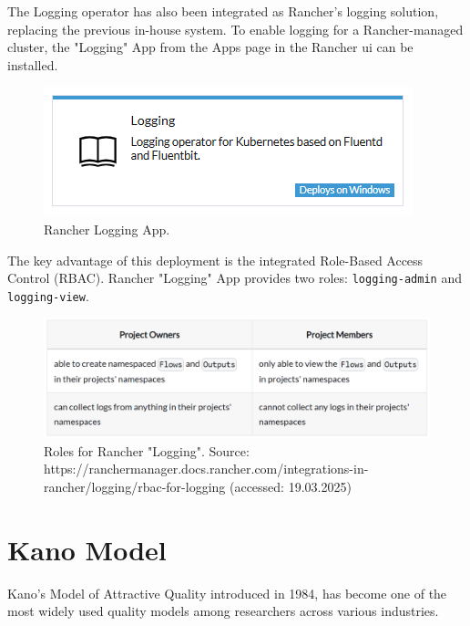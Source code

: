 \documentclass[../main.tex]{subfiles}
\begin{document}
The Logging operator has also been integrated as Rancher's logging solution, replacing the previous in-house system. To enable logging for a Rancher-managed cluster, the "Logging" App from the Apps page in the Rancher \gls{ui} can be installed.

\begin{figure}[H]
        \centering
        \includegraphics[]{img/3-background/centralized_logging/logging_app.png}
        \caption{Rancher Logging App.}
        \label{fig:logging_app}
\end{figure}

The key advantage of this deployment is the integrated Role-Based Access Control (RBAC). Rancher "Logging" App provides two roles: \texttt{logging-admin} and \texttt{logging-view}.

\begin{figure}[H]
        \centering
        \includegraphics[scale=0.7]{img/3-background/rancher_logging_app/roles.png}
        \caption{Roles for Rancher "Logging". Source: https://ranchermanager.docs.rancher.com/integrations-in-rancher/logging/rbac-for-logging (accessed: 19.03.2025)}
        \label{fig:roles}
\end{figure}

\clearpage
\section{Kano Model}

Kano’s Model of Attractive Quality \cite{kano1984attractive} introduced in 1984, has become one of the most widely used quality models among researchers across various industries. 
\end{document}

